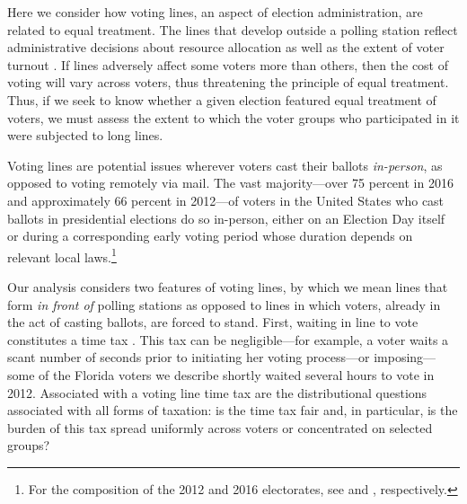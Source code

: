 \documentclass[12pt,titlepage]{article}
\begin{document}

Here we consider how voting lines, an aspect of election
administration, are related to equal treatment.  The lines that
develop outside a polling station reflect administrative decisions
about resource allocation as well as the extent of voter turnout
\citep{herronsmith:hanoverstudy}.  If lines adversely affect some
voters more than others, then the cost of voting will vary across
voters, thus threatening the principle of equal treatment.  Thus, if
we seek to know whether a given election featured equal treatment of
voters, we must assess the extent to which the voter groups who
participated in it were subjected to long lines.

Voting lines are potential issues wherever voters cast their ballots
\emph{in-person}, as opposed to voting remotely via mail.  The vast
majority---over 75 percent in 2016 and approximately 66 percent in
2012---of voters in the United States who cast ballots in presidential
elections do so in-person, either on an Election Day itself or during
a corresponding early voting period whose duration depends on relevant
local laws.\footnote{For the composition of the 2012 and 2016
  electorates, see \citet{eac:2012} and \citet{eac:2016},
  respectively.}




Our analysis considers two features of voting lines, by which we mean
lines that form \emph{in front of} polling stations as opposed to
lines in which voters, already in the act of casting ballots, are
forced to stand. First, waiting in line to vote constitutes a time tax
\citep{mukherjee:timetax}. This tax can be negligible---for example, a
voter waits a scant number of seconds prior to initiating her voting
process---or imposing---some of the Florida voters we describe shortly
waited several hours to vote in 2012. Associated with a voting line
time tax are the distributional questions associated with all forms of
taxation: is the time tax fair and, in particular, is the burden of
this tax spread uniformly across voters or concentrated on selected
groups?
\end{document}
